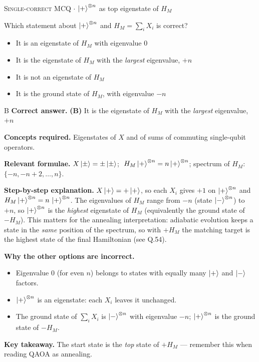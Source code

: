 \documentclass[11pt,a4paper]{article}
\newcommand{\optlabel}[1]{\textbf{(#1)}}
\newcommand{\correctlabel}[1]{\textcolor{okgreen}{\textbf{(#1)}\,\ding{51}}}
\newenvironment{qitem}[1]{\begin{list}{}{\setlength{\leftmargin}{3.3em}\setlength{\labelwidth}{3.1em}%
  \setlength{\labelsep}{0.2em}\setlength{\topsep}{3pt}\setlength{\parsep}{3pt}}\item[\textbf{Q.#1}\hfill]}{\end{list}}
\newcommand{\qsep}{\par\vspace{2pt}{\color{black!15}\hrule}\vspace{4pt}}
\newcommand{\qmeta}[2]{{\footnotesize\color{black!60}\textsc{#1} \;$\cdot$\; #2}\par}
\begin{document}
\begin{qitem}{34}
\qmeta{Single-correct MCQ}{$\ket+^{\otimes n}$ as top eigenstate of $H_M$}
Which statement about $\ket{+}^{\otimes n}$ and $H_M = \sum_{i} X_i$ is correct?
\begin{itemize}[leftmargin=2.6em, labelsep=0.4em, itemsep=2pt, topsep=3pt]
\item[\optlabel{A}] It is an eigenstate of $H_M$ with eigenvalue $0$
\item[\correctlabel{B}] It is the eigenstate of $H_M$ with the \emph{largest} eigenvalue, $+n$
\item[\optlabel{C}] It is not an eigenstate of $H_M$
\item[\optlabel{D}] It is the ground state of $H_M$, with eigenvalue $-n$
\end{itemize}
\end{qitem}
\begin{solbox}{B}
\textbf{\color{brand}Correct answer.} \textcolor{okgreen}{\textbf{(B)}} It is the eigenstate of $H_M$ with the \emph{largest} eigenvalue, $+n$

\textbf{\color{brand}Concepts required.} Eigenstates of $X$ and of sums of commuting single-qubit operators.

\textbf{\color{brand}Relevant formulae.} $X\ket\pm = \pm\ket\pm$; $\ H_M\ket+^{\otimes n} = n\ket+^{\otimes n}$; spectrum of $H_M$: $\{-n, -n+2, \dots, n\}$.

\textbf{\color{brand}Step-by-step explanation.} $X\ket+ = +\ket+$, so each $X_i$ gives $+1$ on $\ket+^{\otimes n}$ and $H_M\ket+^{\otimes n} = n\,\ket+^{\otimes n}$.
The eigenvalues of $H_M$ range from $-n$ (state $\ket-^{\otimes n}$) to $+n$, so $\ket+^{\otimes n}$ is the \emph{highest} eigenstate of
$H_M$ (equivalently the ground state of $-H_M$). This matters for the annealing interpretation: adiabatic evolution keeps a
state in the \emph{same} position of the spectrum, so with $+H_M$ the matching target is the highest state of the final
Hamiltonian (see Q.54).

\textbf{\color{brand}Why the other options are incorrect.}
\begin{itemize}[leftmargin=2.4em, itemsep=1pt, topsep=2pt]
\item[\textbf{(A)}] Eigenvalue $0$ (for even $n$) belongs to states with equally many $\ket+$ and $\ket-$ factors.
\item[\textbf{(C)}] $\ket+^{\otimes n}$ is an eigenstate: each $X_i$ leaves it unchanged.
\item[\textbf{(D)}] The ground state of $\sum_iX_i$ is $\ket-^{\otimes n}$ with eigenvalue $-n$; $\ket+^{\otimes n}$ is the ground state of $-H_M$.
\end{itemize}
\textbf{\color{brand}Key takeaway.} The start state is the \emph{top} state of $+H_M$ --- remember this when reading QAOA as annealing.
\end{solbox}
\qsep
\end{document}
